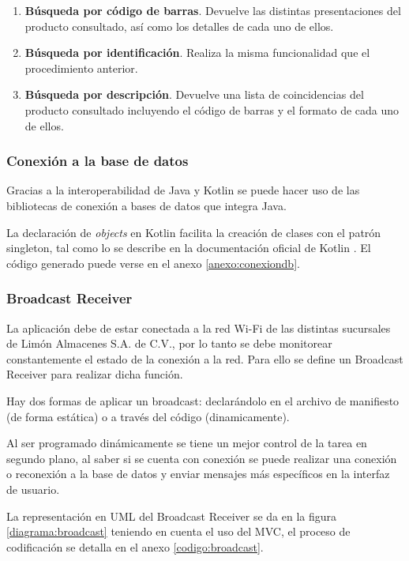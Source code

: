 \begin{enumerate}
	\item \textbf{Búsqueda por código de barras}.
	Devuelve las distintas presentaciones del producto consultado, así como los detalles de cada uno de ellos.
	\item \textbf{Búsqueda por identificación}.
	Realiza la misma funcionalidad que el procedimiento anterior.
	\item \textbf{Búsqueda por descripción}.
	Devuelve una lista de coincidencias del producto consultado incluyendo el código de barras y el formato de cada uno de ellos.
\end{enumerate}

\subsubsection{Conexión a la base de datos}
Gracias a la interoperabilidad de Java y Kotlin se puede hacer uso de las bibliotecas de conexión a bases de datos que integra Java.

La declaración de \textit{objects} en Kotlin facilita la creación de clases con el patrón singleton, tal como lo se describe en la documentación oficial de Kotlin \parencite{DocumentacionKotlin}. El código generado puede verse en el anexo \ref{anexo:conexiondb}.

\subsubsection{Broadcast Receiver}
La aplicación debe de estar conectada a la red Wi-Fi de las distintas sucursales de Limón Almacenes S.A. de C.V., por lo tanto se debe monitorear constantemente el estado de la conexión a la red. Para ello se define un Broadcast Receiver para realizar dicha función.

Hay dos formas de aplicar un broadcast: declarándolo en el archivo de manifiesto (de forma estática) o a través del código (dinamicamente).

Al ser programado dinámicamente se tiene un mejor control de la tarea en segundo plano, al saber si se cuenta con conexión se puede realizar una conexión o reconexión a la base de datos y enviar mensajes más específicos en la interfaz de usuario.

La representación en UML del Broadcast Receiver se da en la figura \ref{diagrama:broadcast} teniendo en cuenta el uso del MVC, el proceso de codificación se detalla en el anexo \ref{codigo:broadcast}.

